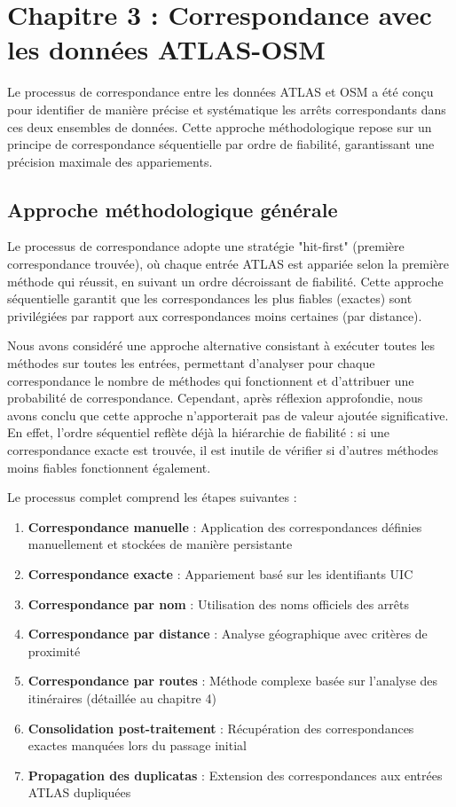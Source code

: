 \chapter{Chapitre 3 : Correspondance avec les données ATLAS-OSM}

Le processus de correspondance entre les données ATLAS et OSM a été conçu pour identifier de manière précise et systématique les arrêts correspondants dans ces deux ensembles de données. Cette approche méthodologique repose sur un principe de correspondance séquentielle par ordre de fiabilité, garantissant une précision maximale des appariements.

\section{Approche méthodologique générale}

Le processus de correspondance adopte une stratégie "hit-first" (première correspondance trouvée), où chaque entrée ATLAS est appariée selon la première méthode qui réussit, en suivant un ordre décroissant de fiabilité. Cette approche séquentielle garantit que les correspondances les plus fiables (exactes) sont privilégiées par rapport aux correspondances moins certaines (par distance).

Nous avons considéré une approche alternative consistant à exécuter toutes les méthodes sur toutes les entrées, permettant d'analyser pour chaque correspondance le nombre de méthodes qui fonctionnent et d'attribuer une probabilité de correspondance. Cependant, après réflexion approfondie, nous avons conclu que cette approche n'apporterait pas de valeur ajoutée significative. En effet, l'ordre séquentiel reflète déjà la hiérarchie de fiabilité : si une correspondance exacte est trouvée, il est inutile de vérifier si d'autres méthodes moins fiables fonctionnent également.

Le processus complet comprend les étapes suivantes :
\begin{enumerate}
    \item \textbf{Correspondance manuelle} : Application des correspondances définies manuellement et stockées de manière persistante
    \item \textbf{Correspondance exacte} : Appariement basé sur les identifiants UIC 
    \item \textbf{Correspondance par nom} : Utilisation des noms officiels des arrêts
    \item \textbf{Correspondance par distance} : Analyse géographique avec critères de proximité
    \item \textbf{Correspondance par routes} : Méthode complexe basée sur l'analyse des itinéraires (détaillée au chapitre 4)
    \item \textbf{Consolidation post-traitement} : Récupération des correspondances exactes manquées lors du passage initial
    \item \textbf{Propagation des duplicatas} : Extension des correspondances aux entrées ATLAS dupliquées
\end{enumerate}

